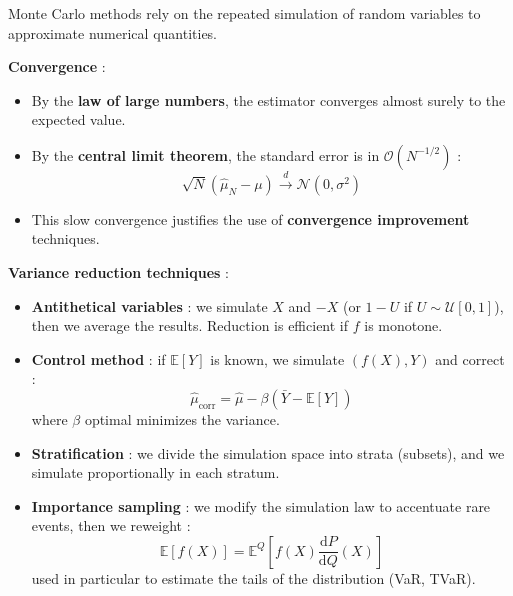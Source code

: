 \begin{f}

Monte Carlo methods rely on the repeated simulation of random variables to approximate numerical quantities.

\textbf{Convergence} :
\begin{itemize}[nosep]
	\item By the \textbf{law of large numbers}, the estimator converges almost surely to the expected value.
	\item By the \textbf{central limit theorem}, the standard error is in $\mathcal{O}(N^{-1/2})$ :
	\[
	\sqrt{N}(\hat{\mu}_N - \mu) \xrightarrow{d} \mathcal{N}(0, \sigma^2)
	\]
	\item This slow convergence justifies the use of \textbf{convergence improvement} techniques.
\end{itemize}

\textbf{Variance reduction techniques} :
\begin{itemize}
	\item \textbf{Antithetical variables} : we simulate $X$ and $-X$ (or $1-U$ if $U \sim \mathcal{U}[0,1]$), then we average the results. Reduction is efficient if $f$ is monotone.
	\item \textbf{Control method} : if $\mathbb{E}[Y]$ is known, we simulate $(f(X), Y)$ and correct :
	\[
	\hat{\mu}_\text{corr} = \hat{\mu} - \beta(\bar{Y} - \mathbb{E}[Y])
	\]
	where $\beta$ optimal minimizes the variance.
	\item \textbf{Stratification} : we divide the simulation space into strata (subsets), and we simulate proportionally in each stratum.
	\item \textbf{Importance sampling} : we modify the simulation law to accentuate rare events, then we reweight :
	\[
	\mathbb{E}[f(X)] = \mathbb{E}^{Q}\left[f(X) \frac{\mathrm{d}P}{\mathrm{d}Q}(X)\right]
	\]
	used in particular to estimate the tails of the distribution (VaR, TVaR).
\end{itemize}

\end{f}
